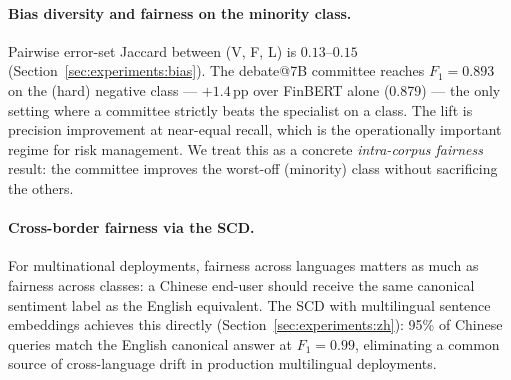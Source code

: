\paragraph{Bias diversity and fairness on the minority class.}
Pairwise error-set Jaccard between (V, F, L) is $0.13$--$0.15$
(Section~\ref{sec:experiments:bias}). The debate@7B committee reaches
$F_1\!=\!0.893$ on the (hard) negative class --- $+1.4$\,pp over
FinBERT alone (0.879) --- the only setting where a committee
strictly beats the specialist on a class. The lift is precision
improvement at near-equal recall, which is the operationally
important regime for risk management. We treat this as a concrete
\emph{intra-corpus fairness} result: the committee improves the
worst-off (minority) class without sacrificing the others.

\paragraph{Cross-border fairness via the SCD.}
For multinational deployments, fairness across languages matters as
much as fairness across classes: a Chinese end-user should receive
the same canonical sentiment label as the English equivalent. The
SCD with multilingual sentence embeddings achieves this directly
(Section~\ref{sec:experiments:zh}): 95\% of Chinese queries match
the English canonical answer at $F_1\!=\!0.99$, eliminating a
common source of cross-language drift in production multilingual
deployments.
